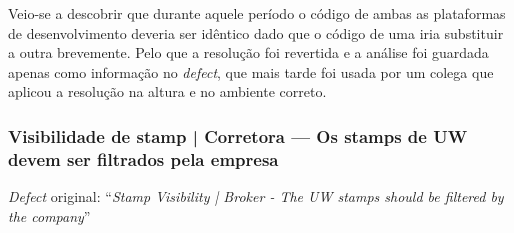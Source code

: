 \begin{enumerate}
                    Veio-se a descobrir que durante aquele período o código de ambas as plataformas de desenvolvimento deveria ser idêntico dado que o código de uma iria substituir a outra brevemente. Pelo que a resolução foi revertida e a análise foi guardada apenas como informação no \textit{defect}, que mais tarde foi usada por um colega que aplicou a resolução na altura e no ambiente correto.
                \end{enumerate}

        \subsubsection{Visibilidade de stamp | Corretora — Os stamps de UW devem ser filtrados pela empresa}\label{visibilidade_de_stamp_defect}

        \textit{Defect} original: ``\textit{Stamp Visibility | Broker - The UW stamps should be filtered by the company}''

